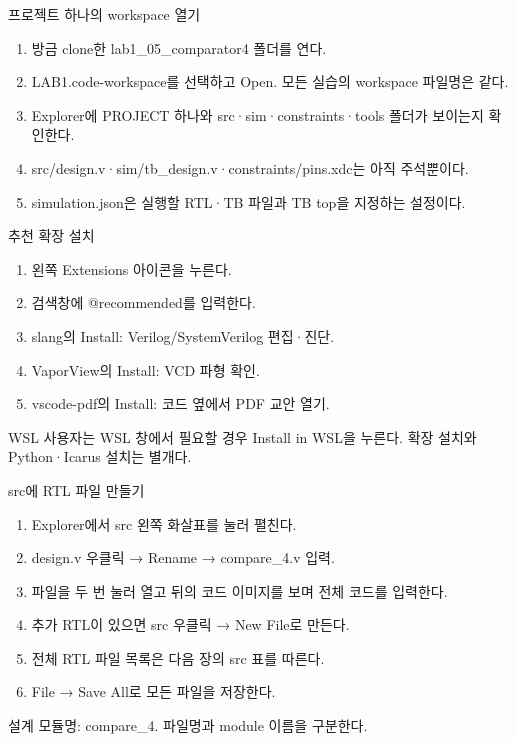 \begin{frame}{프로젝트 하나의 workspace 열기}\relax
\small
\begin{enumerate}\setlength{\itemsep}{0.22cm}
\item 방금 clone한 lab1\_05\_comparator4 폴더를 연다.
\item LAB1.code-workspace를 선택하고 Open. 모든 실습의 workspace 파일명은 같다.
\item Explorer에 PROJECT 하나와 src·sim·constraints·tools 폴더가 보이는지 확인한다.
\item src/design.v·sim/tb\_design.v·constraints/pins.xdc는 아직 주석뿐이다.
\item simulation.json은 실행할 RTL·TB 파일과 TB top을 지정하는 설정이다.
\end{enumerate}

\end{frame}

\begin{frame}{추천 확장 설치}\relax
\small
\begin{enumerate}\setlength{\itemsep}{0.22cm}
\item 왼쪽 Extensions 아이콘을 누른다.
\item 검색창에 @recommended를 입력한다.
\item slang의 Install: Verilog/SystemVerilog 편집·진단.
\item VaporView의 Install: VCD 파형 확인.
\item vscode-pdf의 Install: 코드 옆에서 PDF 교안 열기.
\end{enumerate}
WSL 사용자는 WSL 창에서 필요할 경우 Install in WSL을 누른다. 확장 설치와 Python·Icarus 설치는 별개다.\par
\end{frame}

\begin{frame}{src에 RTL 파일 만들기}\relax
\small
\begin{enumerate}\setlength{\itemsep}{0.22cm}
\item Explorer에서 src 왼쪽 화살표를 눌러 펼친다.
\item design.v 우클릭 → Rename → compare\_4.v 입력.
\item 파일을 두 번 눌러 열고 뒤의 코드 이미지를 보며 전체 코드를 입력한다.
\item 추가 RTL이 있으면 src 우클릭 → New File로 만든다.
\item 전체 RTL 파일 목록은 다음 장의 src 표를 따른다.
\item File → Save All로 모든 파일을 저장한다.
\end{enumerate}
설계 모듈명: compare\_4. 파일명과 module 이름을 구분한다.\par
\end{frame}

